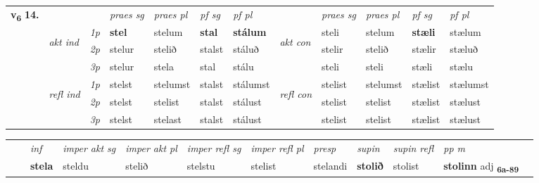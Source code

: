 \begin{tabular}{llllllllllll} \toprule
\multirow{4}{*}{{{\textbf{v{\textsubscript{6}}} \Large{\textbf{14.}}}}}  & &   &  \textit{praes sg}  & \textit{praes pl}  &\textit{ pf sg} & \textit{pf pl} &  &  \textit{praes sg}  & \textit{praes pl}  & \textit{pf sg} & \textit{pf pl } \\*
	\cmidrule{4-7} \cmidrule{9-12}
 & \multirow{3}{*}{\begin{turn}{90}\textit{akt ind}\end{turn}} & {\textit{1p}} & \textbf{stel} & stelum    & \textbf{stal} & \textbf{stálum} & \multirow{3}{*}{\begin{turn}{90}\textit{akt con}\end{turn}} &steli & stelum & \textbf{stæli} & stælum\\*
& &  {\textit{2p}} &  stelur  & stelið   & stalst & stáluð & & stelir & stelið & stælir & stæluð \\*
& &  {\textit{3p}} & stelur & stela   & stal & stálu & & steli & steli& stæli & stælu  \\*
\cmidrule{4-7} \cmidrule{9-12}
 &\multirow{3}{*}{\begin{turn}{90}\textit{refl ind}\end{turn}} & {\textit{1p}} & stelst & stelumst    & stalst & stálumst & \multirow{3}{*}{\begin{turn}{90}\textit{refl con}\end{turn}}  &stelist & stelumst & stælist & stælumst\\*
 &&  {\textit{2p}} &  stelst  & stelist   & stalst & stálust & &stelist & stelist & stælist & stælust \\*
& &  {\textit{3p}} & stelst & stelast   & stalst & stálust & & stelist & stelist& stælist & stælust  \\*
\cmidrule{4-7} \cmidrule{9-12}
\end{tabular}


\begin{tabular}{llllllllllll}
 & & \textit{inf} & \textit{imper akt sg} & \textit{imper akt pl} & \textit{imper refl sg} & \textit{imper refl pl} & \textit{presp} & \textit{supin} & \textit{supin refl} & \textit{pp m}     \\*
  & & \textbf{stela} & steldu  & stelið & stelstu & stelist & stelandi &  \textbf{stolið} & stolist & \textbf{stolinn} adj \textbf{\textsubscript{6a-89}} \\*
\cmidrule{1-12}
\end{tabular}




